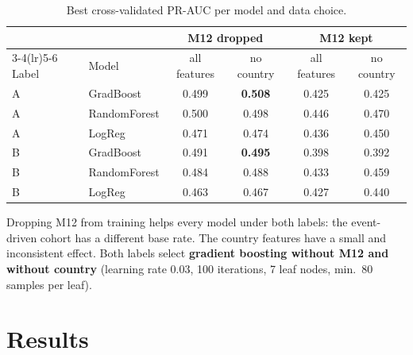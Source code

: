 \documentclass[11pt,a4paper]{article}
\begin{document}
\begin{table}[H]\centering\small
\begin{tabular}{llcccc}\toprule
& & \multicolumn{2}{c}{M12 dropped} & \multicolumn{2}{c}{M12 kept}\\\cmidrule(lr){3-4}\cmidrule(lr){5-6}
Label & Model & all features & no country & all features & no country\\\midrule
A & GradBoost & 0.499 & \textbf{0.508} & 0.425 & 0.425\\
A & RandomForest & 0.500 & 0.498 & 0.446 & 0.470\\
A & LogReg & 0.471 & 0.474 & 0.436 & 0.450\\\midrule
B & GradBoost & 0.491 & \textbf{0.495} & 0.398 & 0.392\\
B & RandomForest & 0.484 & 0.488 & 0.433 & 0.459\\
B & LogReg & 0.463 & 0.467 & 0.427 & 0.440\\\bottomrule
\end{tabular}
\caption{Best cross-validated PR-AUC per model and data choice.}\label{tab:cv}
\end{table}
Dropping M12 from training helps every model under both labels: the event-driven cohort has a different base rate.
The country features have a small and inconsistent effect. Both labels select \textbf{gradient boosting without M12 and without country}
(learning rate 0.03, 100 iterations, 7 leaf nodes, min.\ 80 samples per leaf).

\section{Results}\label{sec:results}
\end{document}
